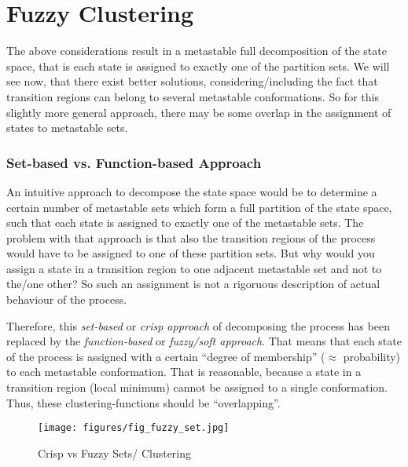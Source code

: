 \section{Fuzzy Clustering}
\label{sec:fuzzy}

The above considerations result in a metastable full decomposition of the state space, that is each state is assigned to exactly one of the partition sets.
We will see now, that there exist better solutions, considering/including the fact that transition regions can belong to several metastable conformations. So for this slightly more general approach,
there may be some overlap in the assignment of states to metastable sets.


\subsubsection*{Set-based vs. Function-based Approach}
An intuitive approach to decompose the state space would be to determine a certain number of metastable sets which form a full partition of the state space, such that each state is assigned to exactly one of the metastable sets.
The problem with that approach is that also the transition regions of the process would have to be assigned to one of these partition sets. But why would you assign a state in a transition region to one adjacent metastable set and not to the/one other? So such an assignment is not a rigoruous description of actual behaviour of the process.

Therefore, this \textit{set-based} or \textit{crisp approach} of decomposing the process has been replaced by the \textit{function-based} or \textit{fuzzy/soft approach}.
That means that each state of the process is assigned with a certain ``degree of membership'' ($\approx$ probability) to each metastable conformation.
That is reasonable, because a state in a transition region (local minimum) cannot be assigned to a single conformation. Thus, these clustering-functions should be ``overlapping''.

\begin{figure}[!ht]
	\centering
	\texttt{[image: figures/fig\_fuzzy\_set.jpg]}
 	\caption{Crisp vs Fuzzy Sets/ Clustering}
        \label{fig:fuzzy}
\end{figure}


